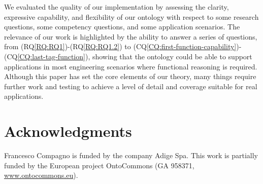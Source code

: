 \documentclass[sw]{iosart2x}
\newcommand{\CQLabel}{\textrm{CQ}}
\newcommand{\RQLabel}{\textrm{RQ}}
\newcommand{\refCQ}[1]{({\CQLabel}\ref{#1})}
\newcommand{\refRQ}[1]{({\RQLabel}\ref{#1})}
\newcommand{\TODO}[1]{{%
}}
\begin{document}
We evaluated the quality of our implementation by assessing the clarity, expressive capability, and flexibility of our ontology with respect to some research questions, some competency questions, and some application scenarios. 
The relevance of our work is highlighted by the ability to answer a series of questions, from \refRQ{RQ:RQ1}-\refRQ{RQ:RQ1.2} to \refCQ{CQ:first-function-capability}-\refCQ{CQ:last-tag-function}, showing that the ontology could be able to support applications in most engineering scenarios where functional reasoning is required. 
Although this paper has set the core elements of our theory, many things require further work and testing to achieve a  level of detail and coverage suitable for real applications.%


\section*{Acknowledgments}


Francesco Compagno is funded
by the company Adige Spa.
This work is partially funded by the European project OntoCommons (GA 958371, \url{www.ontocommons.eu}).


\end{document}
